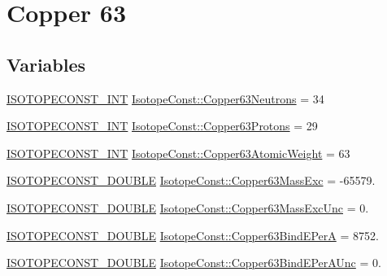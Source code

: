\hypertarget{group___isotope_const-_copper-_cu63}{}\section{Copper 63}
\label{group___isotope_const-_copper-_cu63}
\subsection*{Variables}
\begin{DoxyCompactItemize}
\item 
\mbox{\hyperlink{group___isotope_const-_macros_ga5f18360b3e99483a35c32d789e62621c}{I\+S\+O\+T\+O\+P\+E\+C\+O\+N\+S\+T\+\_\+\+I\+NT}} \mbox{\hyperlink{group___isotope_const-_copper-_cu63_ga89b74f829e2778ad4999c452c190b3e9}{Isotope\+Const\+::\+Copper63\+Neutrons}} = 34
\item 
\mbox{\hyperlink{group___isotope_const-_macros_ga5f18360b3e99483a35c32d789e62621c}{I\+S\+O\+T\+O\+P\+E\+C\+O\+N\+S\+T\+\_\+\+I\+NT}} \mbox{\hyperlink{group___isotope_const-_copper-_cu63_gac424164498758a20eb779eb643a8bf31}{Isotope\+Const\+::\+Copper63\+Protons}} = 29
\item 
\mbox{\hyperlink{group___isotope_const-_macros_ga5f18360b3e99483a35c32d789e62621c}{I\+S\+O\+T\+O\+P\+E\+C\+O\+N\+S\+T\+\_\+\+I\+NT}} \mbox{\hyperlink{group___isotope_const-_copper-_cu63_ga03bf8116f59b55d3abb77d7a619644d2}{Isotope\+Const\+::\+Copper63\+Atomic\+Weight}} = 63
\item 
\mbox{\hyperlink{group___isotope_const-_macros_ga8f45a7272ce02c0b4c65c44636ed719a}{I\+S\+O\+T\+O\+P\+E\+C\+O\+N\+S\+T\+\_\+\+D\+O\+U\+B\+LE}} \mbox{\hyperlink{group___isotope_const-_copper-_cu63_ga9675582929a29d90952e60aaa2b65c89}{Isotope\+Const\+::\+Copper63\+Mass\+Exc}} = -\/65579.
\item 
\mbox{\hyperlink{group___isotope_const-_macros_ga8f45a7272ce02c0b4c65c44636ed719a}{I\+S\+O\+T\+O\+P\+E\+C\+O\+N\+S\+T\+\_\+\+D\+O\+U\+B\+LE}} \mbox{\hyperlink{group___isotope_const-_copper-_cu63_gaedb9215071ddf84540602b5eee0e4763}{Isotope\+Const\+::\+Copper63\+Mass\+Exc\+Unc}} = 0.
\item 
\mbox{\hyperlink{group___isotope_const-_macros_ga8f45a7272ce02c0b4c65c44636ed719a}{I\+S\+O\+T\+O\+P\+E\+C\+O\+N\+S\+T\+\_\+\+D\+O\+U\+B\+LE}} \mbox{\hyperlink{group___isotope_const-_copper-_cu63_gaf9be123faf95400653ebff031b16b159}{Isotope\+Const\+::\+Copper63\+Bind\+E\+PerA}} = 8752.
\item 
\mbox{\hyperlink{group___isotope_const-_macros_ga8f45a7272ce02c0b4c65c44636ed719a}{I\+S\+O\+T\+O\+P\+E\+C\+O\+N\+S\+T\+\_\+\+D\+O\+U\+B\+LE}} \mbox{\hyperlink{group___isotope_const-_copper-_cu63_ga8af665469f4b1de0905c2676107722bb}{Isotope\+Const\+::\+Copper63\+Bind\+E\+Per\+A\+Unc}} = 0.

\end{DoxyCompactItemize}
